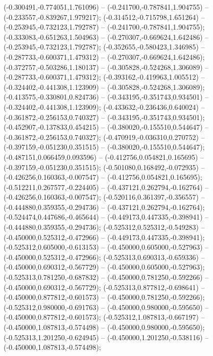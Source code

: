  (-0.300491,-0.774051,1.761096) -- (-0.241700,-0.787841,1.904755) -- (-0.233557,-0.839267,1.979217);
 (-0.314512,-0.715798,1.651264) -- (-0.253945,-0.732123,1.792787) -- (-0.241700,-0.787841,1.904755);
 (-0.333083,-0.651263,1.504963) -- (-0.270307,-0.669624,1.642486) -- (-0.253945,-0.732123,1.792787);
 (-0.352655,-0.580423,1.346985) -- (-0.287733,-0.600371,1.479312) -- (-0.270307,-0.669624,1.642486);
 (-0.372757,-0.503286,1.180137) -- (-0.305828,-0.524268,1.306089) -- (-0.287733,-0.600371,1.479312);
 (-0.393162,-0.419963,1.005512) -- (-0.324402,-0.441308,1.123909) -- (-0.305828,-0.524268,1.306089);
 (-0.413575,-0.330801,0.824736) -- (-0.343195,-0.351743,0.934501) -- (-0.324402,-0.441308,1.123909);
 (-0.433632,-0.236436,0.640024) -- (-0.361872,-0.256153,0.740327) -- (-0.343195,-0.351743,0.934501);
 (-0.452907,-0.137833,0.454215) -- (-0.380020,-0.155510,0.544647) -- (-0.361872,-0.256153,0.740327);
 (-0.470919,-0.036310,0.270752) -- (-0.397159,-0.051230,0.351515) -- (-0.380020,-0.155510,0.544647);
 (-0.487151,0.066459,0.093596) -- (-0.412756,0.054821,0.165695) -- (-0.397159,-0.051230,0.351515);
 (-0.501080,0.168492,-0.072935) -- (-0.426256,0.160363,-0.007547) -- (-0.412756,0.054821,0.165695);
 (-0.512211,0.267577,-0.224405) -- (-0.437121,0.262794,-0.162764) -- (-0.426256,0.160363,-0.007547);
 (-0.520116,0.361397,-0.356557) -- (-0.444880,0.359355,-0.294736) -- (-0.437121,0.262794,-0.162764);
 (-0.524474,0.447686,-0.465644) -- (-0.449173,0.447335,-0.398941) -- (-0.444880,0.359355,-0.294736);
 (-0.525312,0.525312,-0.549283) -- (-0.450000,0.525312,-0.472966) -- (-0.449173,0.447335,-0.398941);
 (-0.525312,0.605000,-0.613153) -- (-0.450000,0.605000,-0.527963) -- (-0.450000,0.525312,-0.472966);
 (-0.525313,0.690313,-0.659336) -- (-0.450000,0.690312,-0.567729) -- (-0.450000,0.605000,-0.527963);
 (-0.525313,0.781250,-0.687832) -- (-0.450000,0.781250,-0.592266) -- (-0.450000,0.690312,-0.567729);
 (-0.525313,0.877812,-0.698641) -- (-0.450000,0.877812,-0.601573) -- (-0.450000,0.781250,-0.592266);
 (-0.525312,0.980000,-0.691763) -- (-0.450000,0.980000,-0.595650) -- (-0.450000,0.877812,-0.601573);
 (-0.525312,1.087813,-0.667197) -- (-0.450000,1.087813,-0.574498) -- (-0.450000,0.980000,-0.595650);
 (-0.525313,1.201250,-0.624945) -- (-0.450000,1.201250,-0.538116) -- (-0.450000,1.087813,-0.574498);
